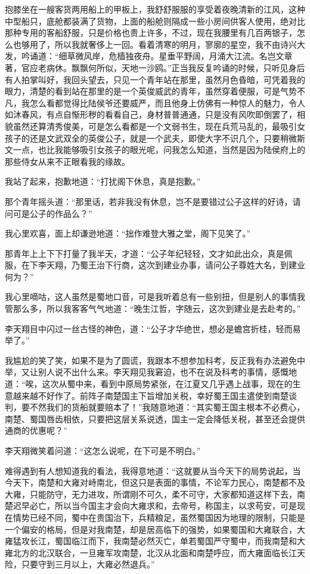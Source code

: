 抱膝坐在一艘客货两用船上的甲板上，我舒舒服服的享受着夜晚清新的江风，这种中型船只，底舱都装满了货物，上面的船舱则隔成一些小房间供客人使用，绝对比那种专用的客船舒服，只是价格也贵上许多，不过，现在我腰里有几百两银子，怎么也够用了，所以我就奢侈上一回。看着清寒的明月，寥廓的星空，我不由诗兴大发，吟诵道：“细草微风岸，危樯独夜舟。星垂平野阔，月涌大江流。名岂文章著，官应老病休。飘飘何所似，天地一沙鸥。”正当我反复吟诵的时候，只听见身后有人拍掌叫好，我回头望去，只见一个青年站在那里，虽然月色昏暗，可凭着我的眼力，清楚的看到站在那里的是一个英俊威武的青年，虽然穿着便服，可是气势不凡，我怎么看都觉得比陆侯爷还要威严，而且他身上仿佛有一种惊人的魅力，令人如沐春风，有点自惭形秽的看看自己，身材普普通通，只是没有风吹即倒罢了，相貌虽然还算清秀俊美，可是怎么看都是一个文弱书生，现在兵荒马乱的，最吸引女孩子的还是文武双全的英俊公子，就是一个武夫，即使大字不识几个，只要稍微斯文一点，也比我能够吸引女孩子的眼光呢，问我怎么知道，当然是因为陆侯府上的那些侍女从来不正眼看我的缘故。

我站了起来，抱歉地道：“打扰阁下休息，真是抱歉。”

那个青年摇头道：“那里话，若非我没有休息，岂不是要错过公子这样的好诗，请问可是公子的作品么？”

我心里欢喜，面上却谦逊地道：“拙作难登大雅之堂，阁下见笑了。”

那青年上上下下打量了我半天，才道：“公子年纪轻轻，文才如此出众，真是佩服，在下李天翔，乃蜀王治下行商，这次到建业办事，请问公子尊姓大名，到建业何为？”

我心里嘀咕，这人虽然是蜀地口音，可是我听着总有一些别扭，但是别人的事情我管那么多，所以我客客气气地道：“晚生江哲，字随云，这次到建业是去赴考的。”

李天翔目中闪过一丝古怪的神色，道：“公子才华绝世，想必是蟾宫折桂，轻而易举了。”

我尴尬的笑了笑，如果不是为了圆谎，我跟本不想参加科考，反正我有办法避免中举，又让别人说不出什么来。李天翔见我窘迫，也不在说及科考的事情，感慨地道：“唉，这次从蜀中来，看到中原局势紧张，在江夏又几乎遇上战事，现在的生意越来越不好作了。前阵子南楚国主下旨增加关税，幸好蜀王国主遣使到南楚谈判，要不然我们的货船就要赔本了！”我随意地道：“其实蜀王国主根本不必费心，南楚、蜀国唇齿相依，只要把这层关系说透，国主一定会降低关税，甚至还会提供通商的优惠呢？”

李天翔微笑着问道：“这怎么说呢，在下可是不明白。”

难得遇到有人想知道我的看法，我得意地道：“这就要从当今天下的局势说起，当今天下，南楚和大雍对峙南北，但这只是表面的事情，不论军力民心，南楚都不及大雍，只能防守，无力进攻，所谓刚不可久，柔不可守，大家都知道这样下去，南楚迟早必亡，所以当今国主才会向大雍求和，去帝号，称国主，以求苟安，可是现在情势已经不同，蜀中在贵国治下，兵精粮足，虽然蜀国因为地理的限制，只能是一个偏安的格局，但是对我南楚，却是居高临下的强势，如果蜀国和大雍联合，大雍猛攻长江，蜀国临江而下，我南楚必然灭亡，单若蜀国严守蜀中，而我南楚和大雍北方的北汉联合，一旦雍军攻南楚，北汉从北面和南楚呼应，而大雍面临长江天险，只要守到三月以上，大雍必然退兵。”

